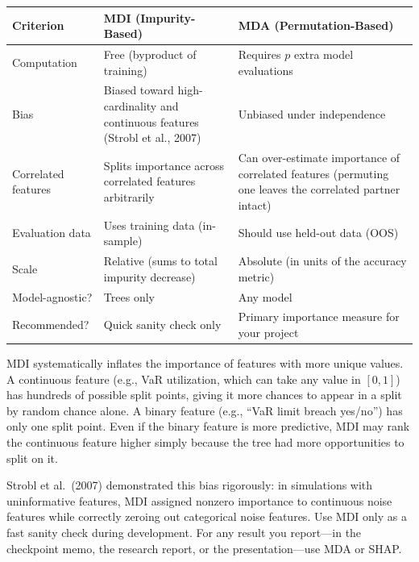 \begin{center}
\begin{tabular}{p{3.8cm} p{5.2cm} p{5.2cm}}
\toprule
\textbf{Criterion} & \textbf{MDI (Impurity-Based)} & \textbf{MDA (Permutation-Based)} \\
\midrule
Computation & Free (byproduct of training) & Requires $p$ extra model evaluations \\[4pt]
Bias & Biased toward high-cardinality and continuous features (Strobl et al., 2007) & Unbiased under independence \\[4pt]
Correlated features & Splits importance across correlated features arbitrarily & Can over-estimate importance of correlated features (permuting one leaves the correlated partner intact) \\[4pt]
Evaluation data & Uses training data (in-sample) & Should use held-out data (OOS) \\[4pt]
Scale & Relative (sums to total impurity decrease) & Absolute (in units of the accuracy metric) \\[4pt]
Model-agnostic? & Trees only & Any model \\[4pt]
Recommended? & Quick sanity check only & Primary importance measure for your project \\
\bottomrule
\end{tabular}
\end{center}

\begin{warning}
MDI systematically inflates the importance of features with more unique values.
A continuous feature (e.g., VaR utilization, which can take any value in $[0, 1]$) has hundreds of possible split points, giving it more chances to appear in a split by random chance alone.
A binary feature (e.g., ``VaR limit breach yes/no'') has only one split point.
Even if the binary feature is more predictive, MDI may rank the continuous feature higher simply because the tree had more opportunities to split on it.

Strobl et al.\ (2007) demonstrated this bias rigorously: in simulations with uninformative features, MDI assigned nonzero importance to continuous noise features while correctly zeroing out categorical noise features.
Use MDI only as a fast sanity check during development.
For any result you report---in the checkpoint memo, the research report, or the presentation---use MDA or SHAP.
\end{warning}

